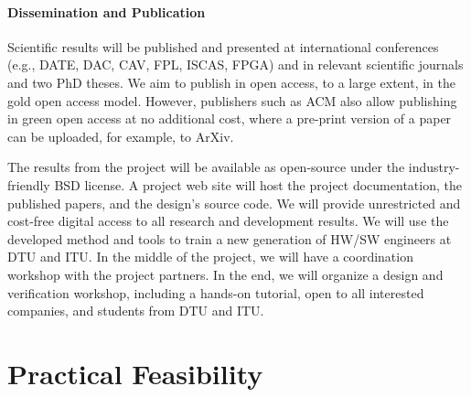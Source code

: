 \documentclass[fleqn,12pt]{article}
\newcommand{\todo}[1]{{\it TODO: #1}}
\begin{document}
\paragraph*{Dissemination and Publication}

Scientific results will be published and presented at international
conferences (e.g., DATE, DAC, CAV, FPL, ISCAS, FPGA) and in relevant scientific journals
and two PhD theses.
We aim to publish in open access, to a large extent, in the gold open access model.
However, publishers such as ACM also allow publishing in green open access
at no additional cost, where a pre-print version of a paper can be uploaded,
for example, to ArXiv.

The results from the project will be available as open-source under the
industry-friendly BSD license.
A project web site will host the project documentation, the published papers, and the design's source code.
We will provide unrestricted and cost-free digital access to all research and development results.
%
We will use the developed method and tools to train a new generation of HW/SW engineers
at DTU and ITU.
In the middle of the project, we will have a coordination workshop with the project partners.
In the end, we will organize a design and verification workshop, including a hands-on tutorial,
open to all interested companies, and students from DTU and ITU.

\section{Practical Feasibility}


%
\end{document}
